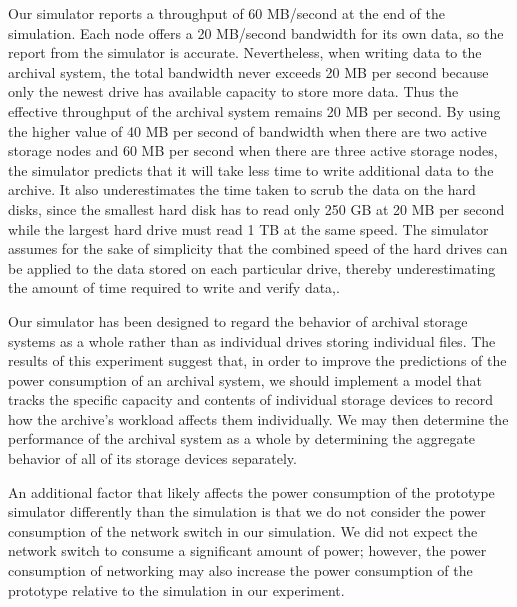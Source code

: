 Our simulator reports a throughput of 60 MB/second at the end of the simulation.  Each node offers a 20 MB/second bandwidth for its own data, so the report from the simulator is accurate.  Nevertheless, when writing data to the archival system, the total bandwidth never exceeds 20 MB per second because only the newest drive has available capacity to store more data.  Thus the effective throughput of the archival system remains 20 MB per second.  By using the higher value of 40 MB per second of bandwidth when there are two active storage nodes and 60 MB per second when there are three active storage nodes, the simulator predicts that it will take less time to write additional data to the archive.  It also underestimates the time taken to scrub the data on the hard disks, since the smallest hard disk has to read only 250 GB at 20 MB per second while the largest hard drive must read 1 TB at the same speed.  The simulator assumes for the sake of simplicity that the combined speed of the hard drives can be applied to the data stored on each particular drive, thereby underestimating the amount of time required to  write and verify data,.

Our simulator has been designed to regard the behavior of archival storage systems as a whole rather than as individual drives storing individual files.  The results of this experiment suggest that, in order to improve the predictions of the power consumption of an archival system, we should implement a model that tracks the specific capacity and contents of individual storage devices to record how the archive's workload affects them individually.  We may then determine the performance of the archival system as a whole by determining the aggregate behavior of all of its storage devices separately.

An additional factor that likely affects the power consumption of the prototype simulator differently than the simulation is that we do not consider the power consumption of the network switch in our simulation.  We did not expect the network switch to consume a significant amount of power; however, the power consumption of networking may also increase the power consumption of the prototype relative to the simulation in our experiment.


